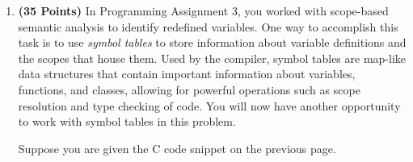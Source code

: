 \documentclass{article}[12pt]
\begin{document}
\begin{enumerate}

\begin{lstlisting}
#include <stdio.h>

int x = 3, r = 5;

int foo(float r) {
    	return x + 2 * r;
}

int bar(float l, float m) {
    	return m - l - x;
}

int pltIsAwesome(int something) {
	    int a = 2, b = 1, c = 3, x;
    	for(x = 0; x < 2; x++) {
        		b -= foo(x);
        		float something = 2.5;
        		if(x < 1) {
            			float x = 2, r = x + 10;
            			something--;
        		}
        		else {
            			int x = 3;
            			b += 1;
        		}
        		something -= r;
        		int r = 2;
        		a += bar(foo(something), x - r);
    	}
    	b += 2;
    	return a * b - x - something;
}

int main() {
    	printf("%d\n", foo(pltIsAwesome(5)));
    	return 0;
}
\end{lstlisting}

    \item \textbf{(35 Points)} In Programming Assignment 3, you worked with scope-based semantic analysis to identify redefined variables. One way to accomplish this task is to use \textit{symbol tables} to store information about variable definitions and the scopes that house them. Used by the compiler, symbol tables are map-like data structures that contain important information about variables, functions, and classes, allowing for powerful operations such as scope resolution and type checking of code. You will now have another opportunity to work with symbol tables in this problem.
    
    Suppose you are given the C code snippet on the previous page.
    

\end{enumerate}
\end{document}
